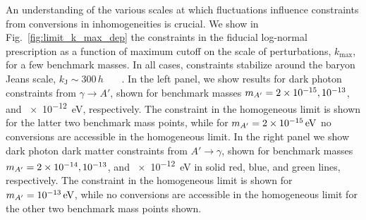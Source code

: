 \documentclass[prd,aps,10pt,nofootinbib,twocolumn,superscriptaddress,preprintnumbers,balancelastpage,longbibliography]{revtex4-1}
\begin{document}
An understanding of the various scales at which fluctuations influence constraints from conversions in inhomogeneities is crucial. We show in Fig.~\ref{fig:limit_k_max_dep} the constraints in the fiducial log-normal prescription as a function of maximum cutoff on the scale of perturbations, $k_\mathrm{max}$, for a few benchmark masses. In all cases, constraints stabilize around the baryon Jeans scale, $k_\mathrm{J}\sim 300\,h$ \SI{}{\per\mega\parsec}. In the left panel, we show results for dark photon constraints from $\gamma\to A'$, shown for benchmark masses $m_{A^\prime} = 2\times10^{-15}, 10^{-13}$, and \SI{e-12}{\eV}, respectively. The constraint in the homogeneous limit is shown for the latter two benchmark mass points, while for $\mAp = \SI{2e-15}{\eV}$ no conversions are accessible in the homogeneous limit. In the right panel we show dark photon dark matter constraints from $A' \to \gamma$, shown for benchmark masses $m_{A^\prime} = 2\times10^{-14}, 10^{-13}$, and \SI{e-12}{\eV} in solid red, blue, and green lines, respectively. The constraint in the homogeneous limit is shown for $\mAp = \SI{e-13}{\eV}$, while no conversions are accessible in the homogeneous limit for the other two benchmark mass points shown.



\end{document}
